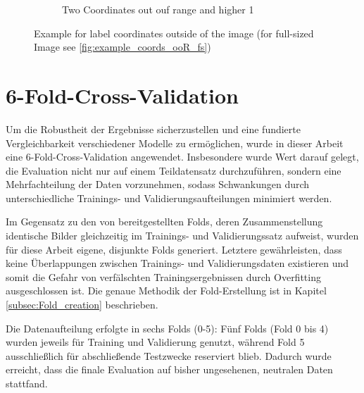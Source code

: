 \begin{figure}[h]
\begin{subfigure}[b]{0.45\textwidth}
        \caption{Two Coordinates out ouf range and higher 1}
        \label{fig:higher1}
    \end{subfigure}
    \caption[Example for label coordinates outside of the image]{Example for label coordinates outside of the image (for full-sized Image see \ref{fig:example_coords_ooR_fs})}
    \label{fig:example_coords_ooR}
\end{figure}







\section{6-Fold-Cross-Validation}
\label{sec_5Fold_CV}

Um die Robustheit der Ergebnisse sicherzustellen und eine fundierte Vergleichbarkeit verschiedener Modelle zu ermöglichen, wurde in dieser Arbeit eine 6-Fold-Cross-Validation angewendet. Insbesondere wurde Wert darauf gelegt, die Evaluation nicht nur auf einem Teildatensatz durchzuführen, sondern eine Mehrfachteilung der Daten vorzunehmen, sodass Schwankungen durch unterschiedliche Trainings- und Validierungsaufteilungen minimiert werden.

Im Gegensatz zu den von \citeauthor{Razakarivony2015} \cite{Razakarivony2015} bereitgestellten Folds, deren Zusammenstellung identische Bilder gleichzeitig im Trainings- und Validierungssatz aufweist, wurden für diese Arbeit eigene, disjunkte Folds generiert. Letztere gewährleisten, dass keine Überlappungen zwischen Trainings- und Validierungsdaten existieren und somit die Gefahr von verfälschten Trainingsergebnissen durch Overfitting ausgeschlossen ist. Die genaue Methodik der Fold-Erstellung ist in Kapitel \ref{subsec:Fold_creation} beschrieben. 

Die Datenaufteilung erfolgte in sechs Folds (0-5): Fünf Folds (Fold 0 bis 4) wurden jeweils für Training und Validierung genutzt, während Fold 5 ausschließlich für abschließende Testzwecke reserviert blieb. Dadurch wurde erreicht, dass die finale Evaluation auf bisher ungesehenen, neutralen Daten stattfand.

